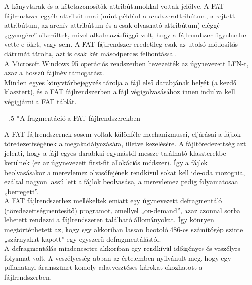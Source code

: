 \documentclass[tikz,12pt,margin=0px]{article}
\makeatletter
\renewcommand\paragraph{%
	\@startsection{paragraph}{4}{0mm}%
	{-\baselineskip}%
	{.5\baselineskip}%
	{\normalfont\normalsize\bfseries}}
\makeatother
\begin{document}
    \noindent A könyvtárak és a kötetazonosítók attribútumokkal voltak jelölve. A FAT fájlrendszer egyéb attribútumai (mint például a rendszerattribútum, a rejtett attribútum, az archív attribútum és a csak olvasható attribútum) eléggé „gyengére” sikerültek, mivel alkalmazásfüggő volt, hogy a fájlrendszer figyelembe vette-e őket, vagy sem. A FAT fájlrendszer eredetileg csak az utolsó módosítás dátumát tárolta, azt is csak két másodperces felbontással.\\

    \noindent A Microsoft Windows 95 operációs rendszerben bevezették az úgynevezett LFN-t, azaz a hosszú fájlnév támogatást.\\

    \noindent Minden egyes könyvtárbejegyzés tárolja a fájl első darabjának helyét (a kezdő klasztert), és a FAT fájlrendszerben a fájl végigolvasásához innen indulva kell végigjárni a FAT táblát.

    \paragraph*{A fragmentáció a FAT fájlrendszerekben}

    \noindent A FAT fájlrendszernek sosem voltak különféle mechanizmusai, eljárásai a fájlok töredezettségének a megakadályozására, illetve kezelésére. A fájltöredezettség azt jelenti, hogy a fájl egyes darabkái egymástól messze található klaszterekbe kerülnek (ez az úgynevezett first-fit allokációs módszer). Így a fájlok beolvasásakor a merevlemez olvasófejének rendkívül sokat kell ide-oda mozognia, ezáltal nagyon lassú lett a fájlok beolvasása, a merevlemez pedig folyamatosan „berregett”.\\

    \noindent A FAT fájlrendszerhez mellékeltek emiatt egy úgynevezett defragmentáló (töredezettségmentesítő) programot, amellyel „on-demand”, azaz azonnal sorba lehetett rendezni a fájlrendszeren található állományokat. Így könnyen megtörténhetett az, hogy egy akkoriban lassan bootoló 486-os számítógép szinte „szárnyakat kapott” egy egyszerű defragmentálástól.\\

    \noindent A defragmentálás mindenesetre akkoriban egy rendkívül időigényes és veszélyes folyamat volt. A veszélyesség abban az értelemben nyilvánult meg, hogy egy pillanatnyi áramszünet komoly adatvesztéses károkat okozhatott a fájlrendszerben.\\
\end{document}
